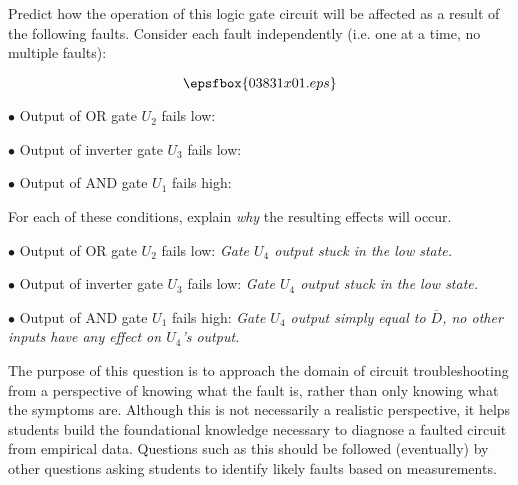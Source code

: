 

Predict how the operation of this logic gate circuit will be affected as a result of the following faults.  Consider each fault independently (i.e. one at a time, no multiple faults):

$$\epsfbox{03831x01.eps}$$

\medskip
\item{$\bullet$} Output of OR gate $U_2$ fails low:
\vskip 5pt
\item{$\bullet$} Output of inverter gate $U_3$ fails low:
\vskip 5pt
\item{$\bullet$} Output of AND gate $U_1$ fails high:
\medskip

For each of these conditions, explain {\it why} the resulting effects will occur.







\medskip
\item{$\bullet$} Output of OR gate $U_2$ fails low: {\it Gate $U_4$ output stuck in the low state.}
\vskip 5pt
\item{$\bullet$} Output of inverter gate $U_3$ fails low: {\it Gate $U_4$ output stuck in the low state.}
\vskip 5pt
\item{$\bullet$} Output of AND gate $U_1$ fails high: {\it Gate $U_4$ output simply equal to $\overline{D}$, no other inputs have any effect on $U_4$'s output.}
\medskip







The purpose of this question is to approach the domain of circuit troubleshooting from a perspective of knowing what the fault is, rather than only knowing what the symptoms are.  Although this is not necessarily a realistic perspective, it helps students build the foundational knowledge necessary to diagnose a faulted circuit from empirical data.  Questions such as this should be followed (eventually) by other questions asking students to identify likely faults based on measurements.




